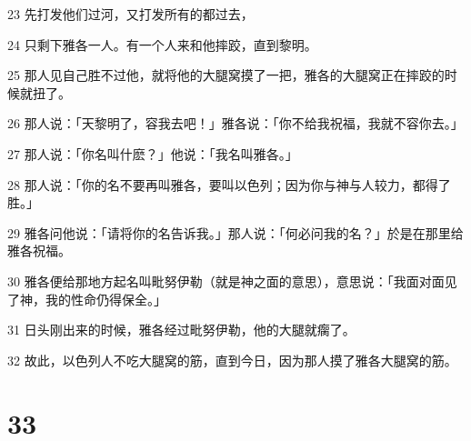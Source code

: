 \par 23 先打发他们过河，又打发所有的都过去，
\par 24 只剩下雅各一人。有一个人来和他摔跤，直到黎明。
\par 25 那人见自己胜不过他，就将他的大腿窝摸了一把，雅各的大腿窝正在摔跤的时候就扭了。
\par 26 那人说：「天黎明了，容我去吧！」雅各说：「你不给我祝福，我就不容你去。」
\par 27 那人说：「你名叫什麽？」他说：「我名叫雅各。」
\par 28 那人说：「你的名不要再叫雅各，要叫以色列；因为你与神与人较力，都得了胜。」
\par 29 雅各问他说：「请将你的名告诉我。」那人说：「何必问我的名？」於是在那里给雅各祝福。
\par 30 雅各便给那地方起名叫毗努伊勒（就是神之面的意思），意思说：「我面对面见了神，我的性命仍得保全。」
\par 31 日头刚出来的时候，雅各经过毗努伊勒，他的大腿就瘸了。
\par 32 故此，以色列人不吃大腿窝的筋，直到今日，因为那人摸了雅各大腿窝的筋。

\chapter{33}

